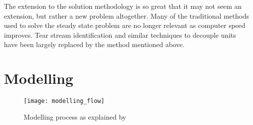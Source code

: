 The extension to the solution methodology is so great that it may not
seem an extension, but rather a new problem altogether.  Many of the
traditional methods used to solve the steady state problem are no
longer relevant as computer speed improves.  Tear stream
identification and similar techniques to decouple units have been
largely replaced by the method mentioned above.

\section{Modelling}
\begin{figure}[htp]
\begin{center}
  \texttt{[image: modelling\_flow]}
  \caption[Modelling process]{Modelling process as explained by
  \citet{biezczad}}
  \label{fig:modellingprocess}
\end{center}
\end{figure}



